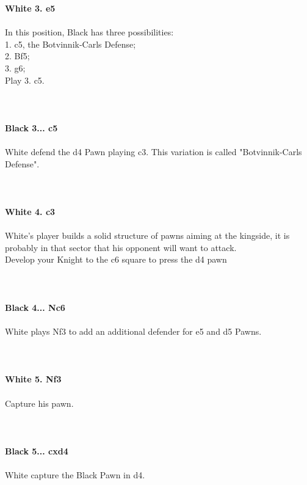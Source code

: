 \documentclass{article}
\begin{document}
\textbf{White 3. e5}\\
\\
In this position, Black has three possibilities:\\1. c5, the Botvinnik-Carls Defense;\\2. Bf5;\\3. g6;\\Play 3. c5. \\
\\

\\
\\
\textbf{Black 3... c5}\\
\\
White defend the d4 Pawn playing c3. This variation is called "Botvinnik-Carls Defense".\\
\\

\\
\\
\textbf{White 4. c3}\\
\\
White's player builds a solid structure of pawns aiming at the kingside, it is probably in that sector that his opponent will want to attack.\\Develop your Knight to the c6 square to press the d4 pawn \\
\\

\\
\\
\textbf{Black 4... Nc6}\\
\\
White plays Nf3 to add an additional defender for e5 and d5 Pawns.\\
\\

\\
\\
\textbf{White 5. Nf3}\\
\\
Capture his pawn.\\
\\

\\
\\
\textbf{Black 5... cxd4}\\
\\
White capture the Black Pawn in d4.\\
\end{document}
